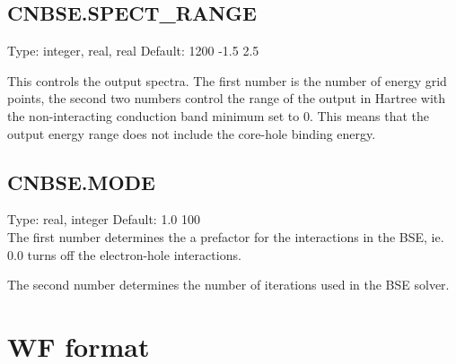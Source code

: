 \documentclass[12pt]{article}
\begin{document}
\subsection{CNBSE.SPECT\_RANGE}
Type: integer, real, real
Default: 1200 -1.5 2.5

This controls the output spectra. The first number is the number of energy grid points, the second two
numbers control the range of the output in Hartree with the non-interacting conduction band minimum
set to 0. This means that the output energy range does not include the core-hole binding energy.


\subsection{CNBSE.MODE}
Type: real, integer
Default: 1.0 100 \\

The first number determines the a prefactor for the interactions in the BSE, ie. 0.0 turns off the 
electron-hole interactions. 

The second number determines the number of iterations used in the BSE solver.

\appendix
\section{WF format}\label{WF_format}
\end{document}
